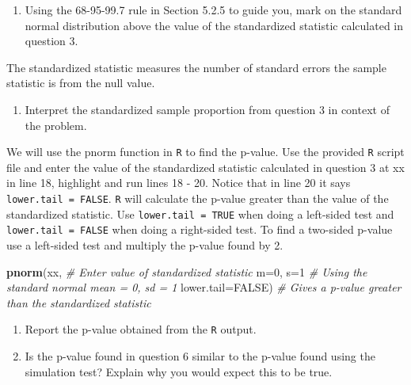 \documentclass[
]{report}
\newenvironment{Shaded}{\begin{snugshade}}{\end{snugshade}}
\newcommand{\CommentTok}[1]{\textcolor[rgb]{0.56,0.35,0.01}{\textit{#1}}}
\newcommand{\DataTypeTok}[1]{\textcolor[rgb]{0.13,0.29,0.53}{#1}}
\newcommand{\DecValTok}[1]{\textcolor[rgb]{0.00,0.00,0.81}{#1}}
\newcommand{\KeywordTok}[1]{\textcolor[rgb]{0.13,0.29,0.53}{\textbf{#1}}}
\newcommand{\NormalTok}[1]{#1}
\newcommand{\OtherTok}[1]{\textcolor[rgb]{0.56,0.35,0.01}{#1}}
\providecommand{\tightlist}{%
  \setlength{\itemsep}{0pt}\setlength{\parskip}{0pt}}
\begin{document}
\begin{enumerate}
\def\labelenumi{\arabic{enumi}.}
\setcounter{enumi}{3}
\tightlist
\item
  Using the 68-95-99.7 rule in Section 5.2.5 to guide you, mark on the standard normal distribution above the value of the standardized statistic calculated in question 3.
\end{enumerate}

\vspace{0.2in}

The standardized statistic measures the number of standard errors the sample statistic is from the null value.

\begin{enumerate}
\def\labelenumi{\arabic{enumi}.}
\setcounter{enumi}{4}
\tightlist
\item
  Interpret the standardized sample proportion from question 3 in context of the problem.
\end{enumerate}

\vspace{1in}

We will use the pnorm function in \texttt{R} to find the p-value. Use the provided \texttt{R} script file and enter the value of the standardized statistic calculated in question 3 at xx in line 18, highlight and run lines 18 - 20. Notice that in line 20 it says \texttt{lower.tail\ =\ FALSE}. \texttt{R} will calculate the p-value greater than the value of the standardized statistic. Use \texttt{lower.tail\ =\ TRUE} when doing a left-sided test and \texttt{lower.tail\ =\ FALSE} when doing a right-sided test. To find a two-sided p-value use a left-sided test and multiply the p-value found by 2.

\begin{Shaded}
\begin{Highlighting}[]
\KeywordTok{pnorm}\NormalTok{(xx, }\CommentTok{\# Enter value of standardized statistic}
      \DataTypeTok{m=}\DecValTok{0}\NormalTok{, }\DataTypeTok{s=}\DecValTok{1} \CommentTok{\# Using the standard normal mean = 0, sd = 1}
      \DataTypeTok{lower.tail=}\OtherTok{FALSE}\NormalTok{) }\CommentTok{\# Gives a p{-}value greater than the standardized statistic}
\end{Highlighting}
\end{Shaded}

\begin{enumerate}
\def\labelenumi{\arabic{enumi}.}
\setcounter{enumi}{5}
\item
  Report the p-value obtained from the \texttt{R} output.
  \vspace{0.2in}
\item
  Is the p-value found in question 6 similar to the p-value found using the simulation test? Explain why you would expect this to be true.
\end{enumerate}
\end{document}
